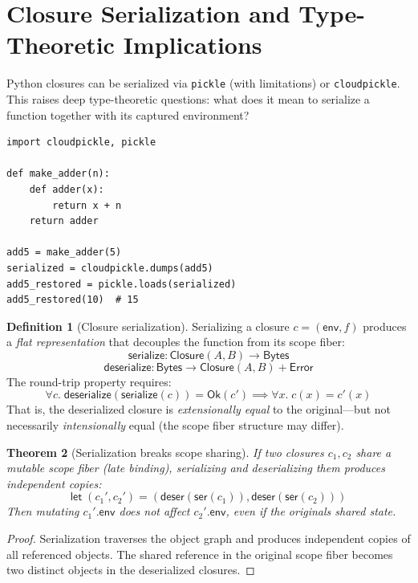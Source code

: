 \documentclass[11pt,a4paper]{report}
\theoremstyle{definition}
\newtheorem{definition}{Definition}[chapter]
\theoremstyle{plain}
\newtheorem{theorem}[definition]{Theorem}
\begin{document}
\section{Closure Serialization and Type-Theoretic Implications}

Python closures can be serialized via \texttt{pickle} (with limitations)
or \texttt{cloudpickle}.  This raises deep type-theoretic questions:
what does it mean to serialize a function together with its captured
environment?

\begin{lstlisting}[style=python]
import cloudpickle, pickle

def make_adder(n):
    def adder(x):
        return x + n
    return adder

add5 = make_adder(5)
serialized = cloudpickle.dumps(add5)
add5_restored = pickle.loads(serialized)
add5_restored(10)  # 15
\end{lstlisting}

\begin{definition}[Closure serialization]
Serializing a closure $c = (\mathsf{env}, f)$ produces a \emph{flat
representation} that decouples the function from its scope fiber:
\[
  \mathsf{serialize} : \mathsf{Closure}(A, B) \to \mathsf{Bytes}
\]
\[
  \mathsf{deserialize} : \mathsf{Bytes} \to \mathsf{Closure}(A, B) + \mathsf{Error}
\]
The round-trip property requires:
\[
  \forall c.\;
  \mathsf{deserialize}(\mathsf{serialize}(c)) = \mathsf{Ok}(c')
  \implies \forall x.\; c(x) = c'(x)
\]
That is, the deserialized closure is \emph{extensionally equal} to the
original---but not necessarily \emph{intensionally} equal (the scope fiber
structure may differ).
\end{definition}

\begin{theorem}[Serialization breaks scope sharing]
If two closures $c_1, c_2$ share a mutable scope fiber (late binding),
serializing and deserializing them produces independent copies:
\[
  \mathsf{let}\;(c_1', c_2') = (\mathsf{deser}(\mathsf{ser}(c_1)),
    \mathsf{deser}(\mathsf{ser}(c_2)))
\]
Then mutating $c_1'.\mathsf{env}$ does not affect $c_2'.\mathsf{env}$,
even if the originals shared state.
\end{theorem}
\begin{proof}
Serialization traverses the object graph and produces independent copies
of all referenced objects.  The shared reference in the original scope
fiber becomes two distinct objects in the deserialized closures.
\end{proof}
\end{document}
